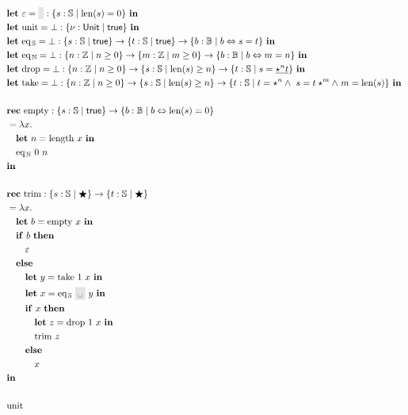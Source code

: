 \documentclass{article}
\newcommand{\Keyword}[1]{\mathbf{#1}\ }
\newcommand{\Let}{\Keyword{let}}
\newcommand{\In}{\Keyword{in}}
\newcommand{\Rec}{\Keyword{rec}}
\newcommand{\If}{\Keyword{if}}
\newcommand{\Then}{\Keyword{then}}
\newcommand{\Else}{\Keyword{else}}
\newcommand{\Unit}{\mathsf{Unit}}
\newcommand{\Int}{\mathbb{Z}}
\newcommand{\String}{\mathbb{S}}
\newcommand{\Bool}{\mathbb{B}}
\newcommand{\Fun}[1]{\mathrm{#1}}
\newcommand{\Var}[1]{#1}
\newcommand{\LitString}[1]{\mathtt{\colorbox{black!10}{\vphantom{X}#1}}}
\newcommand{\LitNum}[1]{#1}
\newcommand{\Ref}[3]{\{#1:#2\mid#3\}}
\newcommand{\true}{\mathsf{true}}
\begin{document}
\begin{align*}
&\Let \Fun{\varepsilon} = \LitString{} : \Ref{s}{\String}{\mathrm{len}(s) = 0}\ \In\\
&\Let \Fun{unit} = \bot : \Ref{\nu}{\Unit}{\true}\ \In\\
&\Let \Fun{eq_\mathbb{\,S}} = \bot : \Ref{s}{\String}{\true} \to \Ref{t}{\String}{\true} \to \Ref{b}{\Bool}{b \Leftrightarrow s = t}\ \In \\
&\Let \Fun{eq_\mathbb{\,N}} = \bot : \Ref{n}{\Int}{n \geq 0} \to \Ref{m}{\Int}{m \geq 0} \to \Ref{b}{\Bool}{b \Leftrightarrow m = n}\ \In \\
&\Let \Fun{drop} = \bot : \Ref{n}{\Int}{n \geq 0} \to \Ref{s}{\String}{\mathrm{len}(s) \geq n } \to \Ref{t}{\String}{s = \underline{\star^n t}}\ \In \\
&\Let \Fun{take} = \bot : \Ref{n}{\Int}{n \geq 0} \to \Ref{s}{\String}{\mathrm{len}(s) \geq n} \to \Ref{t}{\String}{t = \star^n \land\ s = t\star^m \land\ m = \mathrm{len}(s)}\ \In \\
\\
&\Rec \Fun{empty} : \Ref{s}{\String}{\true} \to \Ref{b}{\Bool}{b \Leftrightarrow \mathrm{len}(s) = 0}\\
&= \lambda x.\\
&\quad \Let \Var{n} = \Fun{length}\ \Var{x}\ \In \\
&\quad \Fun{eq_\mathbb{\,N}}\ \LitNum{0}\ \Var{n}\\
&\In \\
\\
&\Rec \Fun{trim} : \Ref{s}{\String}{\bigstar} \to \Ref{t}{\String}{\bigstar}\\
&= \lambda x.\\
&\quad \Let \Var{b} = \Fun{empty}\ \Var{x}\ \In \\
&\quad \If \Var{b}\ \Then\\
&\quad\quad \varepsilon\\
&\quad \Else\\
&\quad\quad \Let \Var{y} = \Fun{take}\ \LitNum{1}\ \Var{x}\ \In\\
&\quad\quad \Let \Var{x} = \Fun{eq_\mathbb{\,S}}\ \LitString{\textvisiblespace}\ \Var{y}\ \In\\
&\quad\quad \If \Var{x}\ \Then\\
&\quad\quad\quad \Let \Var{z} = \Fun{drop}\ \LitNum{1}\ \Var{x}\ \In\\
&\quad\quad\quad \Fun{trim}\ \Var{z}\\
&\quad\quad \Else\\
&\quad\quad\quad x\\
&\In\\
\\
&\Fun{unit}
\end{align*}
\end{document}
